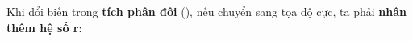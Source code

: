 \documentclass[preview]{standalone}
\begin{document}
\begin{center}
Khi đổi biến trong \textbf{tích phân đôi} (), nếu chuyển sang tọa độ cực, ta phải \textbf{nhân thêm hệ số r}:
\end{center}
\end{document}
